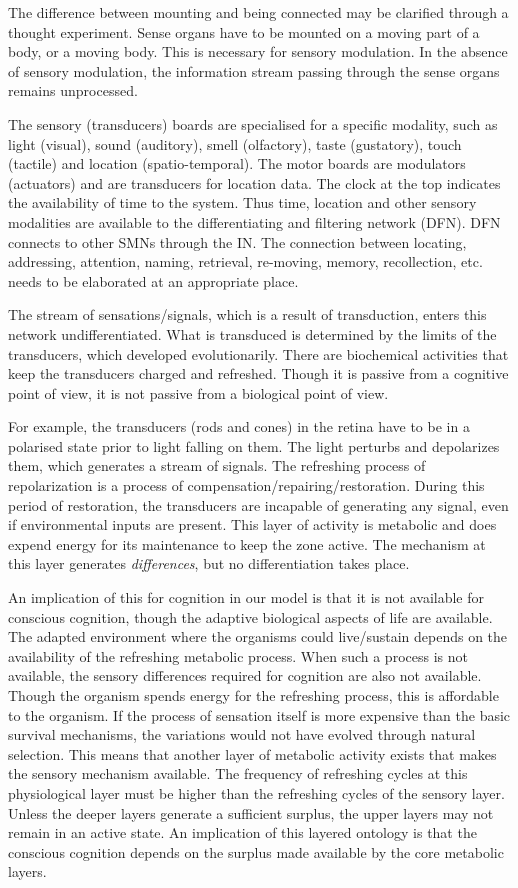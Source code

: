 The difference between mounting and being connected may be clarified through a thought experiment. Sense organs have to be mounted on a moving part of a body, or a moving body. This is necessary for sensory modulation. In the absence of sensory modulation, the information stream passing through the sense organs remains unprocessed.

The sensory (transducers) boards are specialised for a specific modality, such as light (visual), sound (auditory), smell (olfactory), taste (gustatory), touch (tactile) and location (spatio-temporal). The motor boards are modulators (actuators) and are transducers for location data. The clock at the top indicates the availability of time to the system. Thus time, location and other sensory modalities are available to the differentiating and filtering network (DFN). DFN connects to other SMNs through the IN. {The connection between locating, addressing, attention, naming, retrieval, re-moving, memory, recollection, etc. needs to be elaborated at an appropriate place.}

The stream of sensations/signals, which is a result of transduction, enters this network undifferentiated. What is transduced is determined by the limits of the transducers, which developed evolutionarily. There are biochemical activities that keep the transducers charged and refreshed. Though it is passive from a cognitive point of view, it is not passive from a biological point of view. 

For example, the transducers (rods and cones) in the retina have to be in a polarised state prior to light falling on them. The light perturbs and depolarizes them, which generates a stream of signals. The refreshing process of repolarization is a process of compensation/repairing/restoration. During this period of restoration, the transducers are incapable of generating any signal, even if environmental inputs are present. This layer of activity is metabolic and does expend energy for its maintenance to keep the zone active. The mechanism at this layer generates \textit{differences}, but no differentiation takes place. 

An implication of this for cognition in our model is that it is not available for conscious cognition, though the adaptive biological aspects of life are available. The adapted environment where the organisms could live/sustain depends on the availability of the refreshing metabolic process. When such a process is not available, the sensory differences required for cognition are also not available. Though the organism spends energy for the refreshing process, this is affordable to the organism. If the process of sensation itself is more expensive than the basic survival mechanisms, the variations would not have evolved through natural selection. This means that another layer of metabolic activity exists that makes the sensory mechanism available. The frequency of refreshing cycles at this physiological layer must be higher than the refreshing cycles of the sensory layer. Unless the deeper layers generate a sufficient surplus, the upper layers may not remain in an active state. An implication of this layered ontology is that the conscious cognition depends on the surplus made available by the core metabolic layers.

